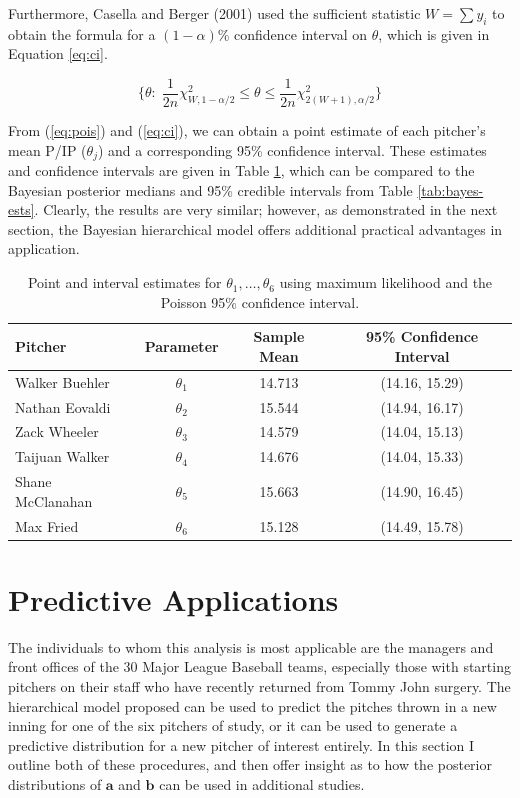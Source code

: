 \documentclass{article}
\begin{document}
Furthermore, Casella and Berger (2001) used the sufficient statistic $W=\sum y_i$ to obtain the formula for a $(1-\alpha)$\% confidence interval on $\theta$, which is given in Equation \ref{eq:ci}.

\begin{equation}
    \Big\{ \theta: \; \frac{1}{2n}\chi^2_{W,1-\alpha/2} \leq \theta \leq 
    \frac{1}{2n} \chi^2_{2(W+1),\alpha/2} \Big\}
    \label{eq:ci}
\end{equation}

From (\ref{eq:pois}) and (\ref{eq:ci}), we can obtain a point estimate of each pitcher's mean P/IP ($\theta_j$) and a corresponding 95\% confidence interval. These estimates and confidence intervals are given in Table \ref{tab:freq}, which can be compared to the Bayesian posterior medians and 95\% credible intervals from Table \ref{tab:bayes-ests}. Clearly, the results are very similar; however, as demonstrated in the next section, the Bayesian hierarchical model offers additional practical advantages in application.

\begin{table}[h]
    \centering
    \begin{tabular}{lccc}
         \hline
         Pitcher & Parameter & Sample Mean & 95\% Confidence Interval \\
         \hline
         Walker Buehler & $\theta_1$ & 14.713 & (14.16, 15.29) \\
         Nathan Eovaldi & $\theta_2$ &  15.544 & (14.94, 16.17) \\
         Zack Wheeler & $\theta_3$ & 14.579 & (14.04, 15.13) \\
         Taijuan Walker & $\theta_4$ & 14.676 & (14.04, 15.33) \\
         Shane McClanahan & $\theta_5$ & 15.663 & (14.90, 16.45) \\
         Max Fried & $\theta_6$ & 15.128 & (14.49, 15.78) \\
         \hline
    \end{tabular}
    \caption{Point and interval estimates for $\theta_1, \hdots, \theta_6$ using maximum likelihood and the Poisson 95\% confidence interval.}
    \label{tab:freq}
\end{table}


\section{Predictive Applications}

The individuals to whom this analysis is most applicable are the managers and front offices of the 30 Major League Baseball teams, especially those with starting pitchers on their staff who have recently returned from Tommy John surgery. The hierarchical model proposed can be used to predict the pitches thrown in a new inning for one of the six pitchers of study, or it can be used to generate a predictive distribution for a new pitcher of interest entirely. In this section I outline both of these procedures, and then offer insight as to how the posterior distributions of $\mathbf{a}$ and $\mathbf{b}$ can be used in additional studies. 
\end{document}
